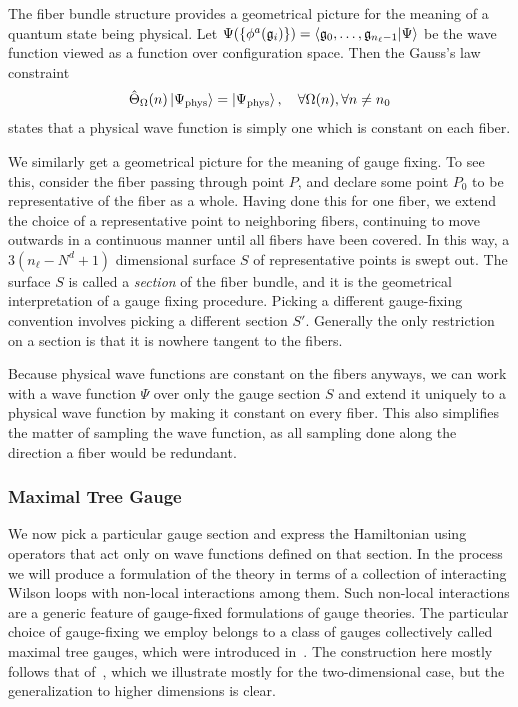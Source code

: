 \documentclass[reprint,superscriptaddress,pra,nofootinbib,preprintnumbers,floatfix]{revtex4-1}
\providecommand{\g}{{\mathfrak{g}}}
\begin{document}
The fiber bundle structure provides a geometrical picture for the meaning of a quantum state being physical. 
%
Let $\Psi(\{\phi^a(\g_i)\}) = \bra{\g_0,\dotsc,\g_{n_\ell-1}}\ket{\Psi}$ be the wave function viewed as a function over configuration space. 
%
Then the Gauss's law constraint
%
\begin{align}
    \hat{\Theta}_\Omega(n) \ket{\Psi_\text{phys}} = \ket{\Psi_\text{phys}} \qc
    \forall \Omega(n), \forall n \neq n_0
\end{align}
%
states that a physical wave function is simply one which is constant on each fiber. 



We similarly get a geometrical picture for the meaning of gauge fixing. 
%
To see this, consider the fiber passing through point $P$, and declare some point $P_0$ to be representative of the fiber as a whole. Having done this for one fiber, we extend the choice of a representative point to neighboring fibers, continuing to move outwards in a continuous manner until all fibers have been covered. 
%
In this way, a $3(n_\ell - N^d + 1)$ dimensional surface $S$ of representative points is swept out. 
%
The surface $S$ is called a \emph{section} of the fiber bundle, and it is the geometrical interpretation of a gauge fixing procedure. 
%
Picking a different gauge-fixing convention involves picking a different section $S'$. Generally the only restriction on a section is that it is nowhere tangent to the fibers.

Because physical wave functions are constant on the fibers anyways, we can work with a wave function $\Psi$ over only the gauge section $S$ and extend it uniquely to a physical wave function by making it constant on every fiber. 
%
This also simplifies the matter of sampling the wave function, as all sampling done along the direction a fiber would be redundant. 



\subsubsection{Maximal Tree Gauge}\label{sec:max_tree_gauge_general}

We now pick a particular gauge section and express the Hamiltonian using operators that act only on wave functions defined on that section. 
%
In the process we will produce a formulation of the theory in terms of a collection of interacting Wilson loops with non-local interactions among them. 
%
Such non-local interactions are a generic feature of gauge-fixed formulations of gauge theories. 
%
The particular choice of gauge-fixing we employ belongs to a class of gauges collectively called maximal tree gauges, which were introduced in~\cite{PhysRevD.15.1128}. 
%
The construction here mostly follows that of~\cite{Ligterink_2000}, which we illustrate mostly for the two-dimensional case, but the generalization to higher dimensions is clear.
\end{document}
